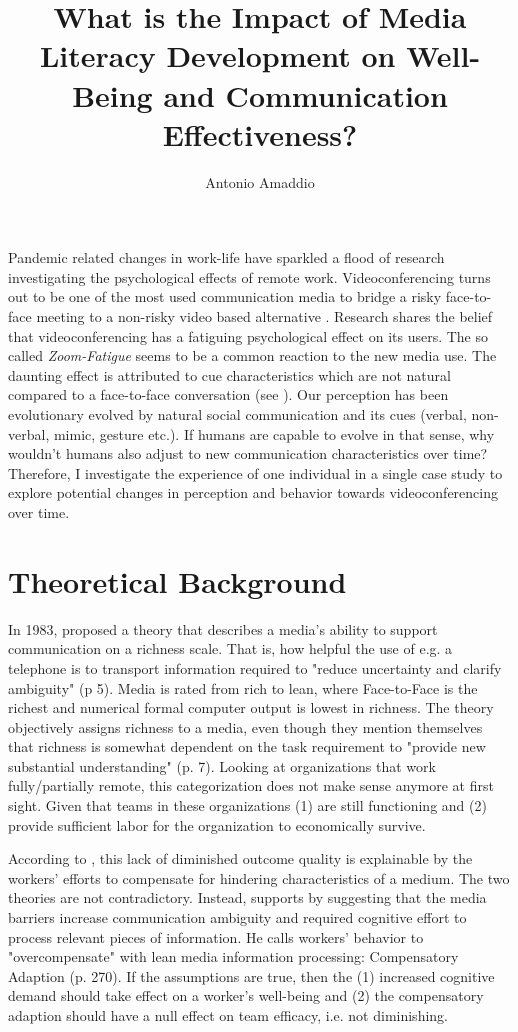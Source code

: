\documentclass[man]{apa7}
\title{What is the Impact of Media Literacy Development on Well-Being and Communication Effectiveness?}
\author{Antonio Amaddio}
\affiliation{Freie Universität Berlin \\ A\&O Vertiefung, Winter 2022/23, Supervisor: Dr. Lisa Handke}
\begin{document}
\maketitle
Pandemic related changes in work-life have sparkled a flood of research investigating the psychological effects of remote work. Videoconferencing turns out to be one of the most used communication media to bridge a risky face-to-face meeting to a non-risky video based alternative \parencite{Riedl2021}.  Research shares the belief that videoconferencing has a fatiguing psychological effect on its users. The so called \textit{Zoom-Fatigue} seems to be a common reaction to the new media use. The daunting effect is attributed to cue characteristics which are not natural compared to a face-to-face conversation (see \cite{Riedl2021}). Our perception has been evolutionary evolved by natural social communication and its cues (verbal, non-verbal, mimic, gesture etc.). If humans are capable to evolve in that sense, why wouldn't humans also adjust to new communication characteristics over time? Therefore, I investigate the experience of one individual in a single case study to explore potential changes in perception and behavior towards videoconferencing over time.

\section{Theoretical Background}

In 1983, \citeauthor{daft1983information} proposed a theory that describes a media's ability to support communication on a richness scale. That is, how helpful the use of e.g. a telephone is to transport information required to "reduce uncertainty and clarify ambiguity" (p 5). Media is rated from rich to lean, where Face-to-Face is the richest and numerical formal computer output is lowest in richness. The theory objectively assigns richness to a media, even though they mention themselves that richness is somewhat dependent on the task requirement to "provide new substantial understanding" (p. 7). Looking at organizations that work fully/partially remote, this categorization does not make sense anymore at first sight. Given that teams in these organizations (1) are still functioning and (2) provide sufficient labor for the organization to economically survive.

According to \citeauthor{Kock2005}, this lack of diminished outcome quality is explainable by the workers' efforts to compensate for hindering characteristics of a medium. The two theories are not contradictory. Instead, \citeauthor{Kock2005} supports by suggesting that the media barriers increase communication ambiguity and required cognitive effort to process relevant pieces of information. He calls workers' behavior to "overcompensate" with lean media information processing: Compensatory Adaption (p. 270). If the assumptions are true, then the (1) increased cognitive demand should take effect on a worker's well-being and (2) the compensatory adaption should have a null effect on team efficacy, i.e. not diminishing.
\end{document}
